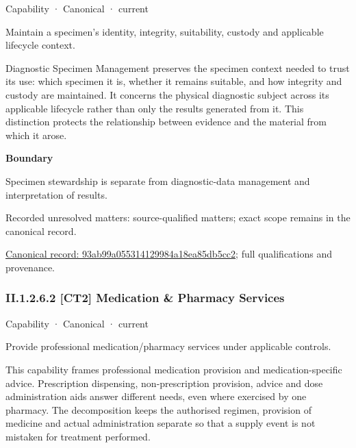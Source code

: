 \label{element:93ab99a055314129984a18ea85db5cc2}
{\small Capability · Canonical · current}\par

Maintain a specimen’s identity, integrity, suitability, custody and applicable lifecycle context.



Diagnostic Specimen Management preserves the specimen context needed to trust its use: which specimen it is, whether it remains suitable, and how integrity and custody are maintained. It concerns the physical diagnostic subject across its applicable lifecycle rather than only the results generated from it. This distinction protects the relationship between evidence and the material from which it arose.



\textbf{Boundary}



Specimen stewardship is separate from diagnostic-data management and interpretation of results.


{\small Recorded unresolved matters: source-qualified matters; exact scope remains in the canonical record.}\par
{\footnotesize \href{../../../../continuum/strategy/capability/93ab99a055314129984a18ea85db5cc2.md}{Canonical record: 93ab99a055314129984a18ea85db5cc2}; full qualifications and provenance.}\par
\subsubsection*{II.1.2.6.2 [CT2] Medication \& Pharmacy Services}
\label{navigation:II.1.2.6.2}

\label{element:ab2a4e6a7acc4868bc4e7b6c0d292cb4}
{\small Capability · Canonical · current}\par

Provide professional medication/pharmacy services under applicable controls.



This capability frames professional medication provision and medication-specific advice. Prescription dispensing, non-prescription provision, advice and dose administration aids answer different needs, even where exercised by one pharmacy. The decomposition keeps the authorised regimen, provision of medicine and actual administration separate so that a supply event is not mistaken for treatment performed.



